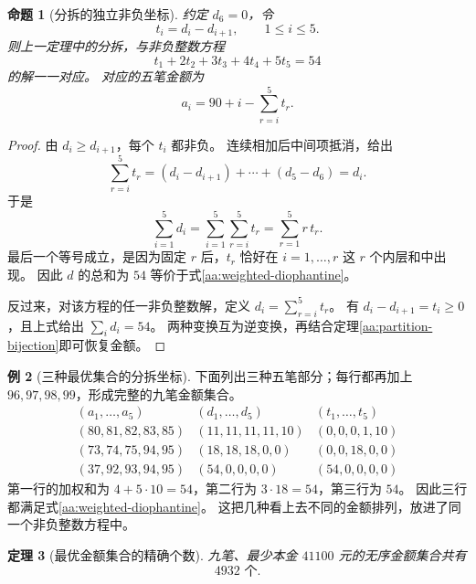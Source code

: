 \documentclass[UTF8,a4paper]{ctexbook}
\newtheorem{theorem}{定理}[chapter]
\newtheorem{proposition}[theorem]{命题}
\theoremstyle{definition}
\newtheorem{example}[theorem]{例}
\numberwithin{equation}{chapter}
\newcommand{\1}{\mathbf{1}}
\newcommand{\OptimalSetCount}{4932}
\begin{document}
\begin{proposition}[分拆的独立非负坐标]\label{aa:difference-coordinates}
约定 \(d_6=0\)，令
\[
t_i=d_i-d_{i+1},\qquad 1\le i\le5.
\]
则上一定理中的分拆，与非负整数方程
\begin{equation}\label{aa:weighted-diophantine}
t_1+2t_2+3t_3+4t_4+5t_5=54
\end{equation}
的解一一对应。
对应的五笔金额为
\[
a_i=90+i-\sum_{r=i}^{5}t_r.
\]
\end{proposition}

\begin{proof}
由 \(d_i\ge d_{i+1}\)，每个 \(t_i\) 都非负。
连续相加后中间项抵消，给出
\[
\sum_{r=i}^{5}t_r
=(d_i-d_{i+1})+\cdots+(d_5-d_6)=d_i.
\]
于是
\[
\sum_{i=1}^{5}d_i
=\sum_{i=1}^{5}\sum_{r=i}^{5}t_r
=\sum_{r=1}^{5}r\,t_r.
\]
最后一个等号成立，是因为固定 \(r\) 后，\(t_r\) 恰好在
\(i=1,\ldots,r\) 这 \(r\) 个内层和中出现。
因此 \(d\) 的总和为 \(54\) 等价于式\eqref{aa:weighted-diophantine}。

反过来，对该方程的任一非负整数解，定义
\(d_i=\sum_{r=i}^{5}t_r\)。
有 \(d_i-d_{i+1}=t_i\ge0\)，且上式给出 \(\sum_i d_i=54\)。
两种变换互为逆变换，再结合定理\ref{aa:partition-bijection}即可恢复金额。
\end{proof}

\begin{example}[三种最优集合的分拆坐标]\label{aa:partition-examples}
下面列出三种五笔部分；每行都再加上 \(96,97,98,99\)，形成完整的九笔金额集合。
\[
\begin{array}{c|c|c}
(a_1,\ldots,a_5)&(d_1,\ldots,d_5)&(t_1,\ldots,t_5)\\ \hline
(80,81,82,83,85)&(11,11,11,11,10)&(0,0,0,1,10)\\
(73,74,75,94,95)&(18,18,18,0,0)&(0,0,18,0,0)\\
(37,92,93,94,95)&(54,0,0,0,0)&(54,0,0,0,0)
\end{array}
\]
第一行的加权和为 \(4+5\cdot10=54\)，第二行为 \(3\cdot18=54\)，第三行为 \(54\)。
因此三行都满足式\eqref{aa:weighted-diophantine}。
这把几种看上去不同的金额排列，放进了同一个非负整数方程中。
\end{example}

\begin{theorem}[最优金额集合的精确个数]\label{aa:optimal-count}
九笔、最少本金 \(41100\) 元的无序金额集合共有
\[
\boxed{\OptimalSetCount\text{ 个}}.
\]
\end{theorem}
\end{document}
